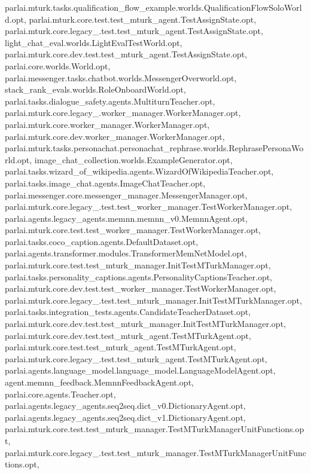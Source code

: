 parlai.\+mturk.\+tasks.\+qualification\+\_\+flow\+\_\+example.\+worlds.\+Qualification\+Flow\+Solo\+World.\+opt, parlai.\+mturk.\+core.\+test.\+test\+\_\+mturk\+\_\+agent.\+Test\+Assign\+State.\+opt, parlai.\+mturk.\+core.\+legacy\+\_.\+test.\+test\+\_\+mturk\+\_\+agent.\+Test\+Assign\+State.\+opt, light\+\_\+chat\+\_\+eval.\+worlds.\+Light\+Eval\+Test\+World.\+opt, parlai.\+mturk.\+core.\+dev.\+test.\+test\+\_\+mturk\+\_\+agent.\+Test\+Assign\+State.\+opt, parlai.\+core.\+worlds.\+World.\+opt, parlai.\+messenger.\+tasks.\+chatbot.\+worlds.\+Messenger\+Overworld.\+opt, stack\+\_\+rank\+\_\+evals.\+worlds.\+Role\+Onboard\+World.\+opt, parlai.\+tasks.\+dialogue\+\_\+safety.\+agents.\+Multiturn\+Teacher.\+opt, parlai.\+mturk.\+core.\+legacy\+\_.\+worker\+\_\+manager.\+Worker\+Manager.\+opt, parlai.\+mturk.\+core.\+worker\+\_\+manager.\+Worker\+Manager.\+opt, parlai.\+mturk.\+core.\+dev.\+worker\+\_\+manager.\+Worker\+Manager.\+opt, parlai.\+mturk.\+tasks.\+personachat.\+personachat\+\_\+rephrase.\+worlds.\+Rephrase\+Persona\+World.\+opt, image\+\_\+chat\+\_\+collection.\+worlds.\+Example\+Generator.\+opt, parlai.\+tasks.\+wizard\+\_\+of\+\_\+wikipedia.\+agents.\+Wizard\+Of\+Wikipedia\+Teacher.\+opt, parlai.\+tasks.\+image\+\_\+chat.\+agents.\+Image\+Chat\+Teacher.\+opt, parlai.\+messenger.\+core.\+messenger\+\_\+manager.\+Messenger\+Manager.\+opt, parlai.\+mturk.\+core.\+legacy\+\_.\+test.\+test\+\_\+worker\+\_\+manager.\+Test\+Worker\+Manager.\+opt, parlai.\+agents.\+legacy\+\_\+agents.\+memnn.\+memnn\+\_\+v0.\+Memnn\+Agent.\+opt, parlai.\+mturk.\+core.\+test.\+test\+\_\+worker\+\_\+manager.\+Test\+Worker\+Manager.\+opt, parlai.\+tasks.\+coco\+\_\+caption.\+agents.\+Default\+Dataset.\+opt, parlai.\+agents.\+transformer.\+modules.\+Transformer\+Mem\+Net\+Model.\+opt, parlai.\+mturk.\+core.\+test.\+test\+\_\+mturk\+\_\+manager.\+Init\+Test\+M\+Turk\+Manager.\+opt, parlai.\+tasks.\+personality\+\_\+captions.\+agents.\+Personality\+Captions\+Teacher.\+opt, parlai.\+mturk.\+core.\+dev.\+test.\+test\+\_\+worker\+\_\+manager.\+Test\+Worker\+Manager.\+opt, parlai.\+mturk.\+core.\+legacy\+\_.\+test.\+test\+\_\+mturk\+\_\+manager.\+Init\+Test\+M\+Turk\+Manager.\+opt, parlai.\+tasks.\+integration\+\_\+tests.\+agents.\+Candidate\+Teacher\+Dataset.\+opt, parlai.\+mturk.\+core.\+dev.\+test.\+test\+\_\+mturk\+\_\+manager.\+Init\+Test\+M\+Turk\+Manager.\+opt, parlai.\+mturk.\+core.\+dev.\+test.\+test\+\_\+mturk\+\_\+agent.\+Test\+M\+Turk\+Agent.\+opt, parlai.\+mturk.\+core.\+test.\+test\+\_\+mturk\+\_\+agent.\+Test\+M\+Turk\+Agent.\+opt, parlai.\+mturk.\+core.\+legacy\+\_.\+test.\+test\+\_\+mturk\+\_\+agent.\+Test\+M\+Turk\+Agent.\+opt, parlai.\+agents.\+language\+\_\+model.\+language\+\_\+model.\+Language\+Model\+Agent.\+opt, agent.\+memnn\+\_\+feedback.\+Memnn\+Feedback\+Agent.\+opt, parlai.\+core.\+agents.\+Teacher.\+opt, parlai.\+agents.\+legacy\+\_\+agents.\+seq2seq.\+dict\+\_\+v0.\+Dictionary\+Agent.\+opt, parlai.\+agents.\+legacy\+\_\+agents.\+seq2seq.\+dict\+\_\+v1.\+Dictionary\+Agent.\+opt, parlai.\+mturk.\+core.\+test.\+test\+\_\+mturk\+\_\+manager.\+Test\+M\+Turk\+Manager\+Unit\+Functions.\+opt, parlai.\+mturk.\+core.\+legacy\+\_.\+test.\+test\+\_\+mturk\+\_\+manager.\+Test\+M\+Turk\+Manager\+Unit\+Functions.\+opt, 